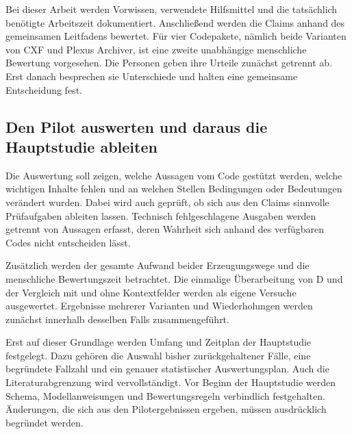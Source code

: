 \documentclass[10pt,a4paper]{article}
\begin{document}
Bei dieser Arbeit werden Vorwissen, verwendete Hilfsmittel und die tatsächlich benötigte Arbeitszeit dokumentiert. Anschlie\ss{}end werden die Claims anhand des gemeinsamen Leitfadens bewertet. Für vier Codepakete, nämlich beide Varianten von CXF und Plexus Archiver, ist eine zweite unabhängige menschliche Bewertung vorgesehen. Die Personen geben ihre Urteile zunächst getrennt ab. Erst danach besprechen sie Unterschiede und halten eine gemeinsame Entscheidung fest.

\subsection{Den Pilot auswerten und daraus die Hauptstudie ableiten}
Die Auswertung soll zeigen, welche Aussagen vom Code gestützt werden, welche wichtigen Inhalte fehlen und an welchen Stellen Bedingungen oder Bedeutungen verändert wurden. Dabei wird auch geprüft, ob sich aus den Claims sinnvolle Prüfaufgaben ableiten lassen. Technisch fehlgeschlagene Ausgaben werden getrennt von Aussagen erfasst, deren Wahrheit sich anhand des verfügbaren Codes nicht entscheiden lässt.

Zusätzlich werden der gesamte Aufwand beider Erzeugungswege und die menschliche Bewertungszeit betrachtet. Die einmalige Überarbeitung von D und der Vergleich mit und ohne Kontextfelder werden als eigene Versuche ausgewertet. Ergebnisse mehrerer Varianten und Wiederholungen werden zunächst innerhalb desselben Falls zusammengeführt.

Erst auf dieser Grundlage werden Umfang und Zeitplan der Hauptstudie festgelegt. Dazu gehören die Auswahl bisher zurückgehaltener Fälle, eine begründete Fallzahl und ein genauer statistischer Auswertungsplan. Auch die Literaturabgrenzung wird vervollständigt. Vor Beginn der Hauptstudie werden Schema, Modellanweisungen und Bewertungsregeln verbindlich festgehalten. Änderungen, die sich aus den Pilotergebnissen ergeben, müssen ausdrücklich begründet werden.

\newpage
\end{document}
